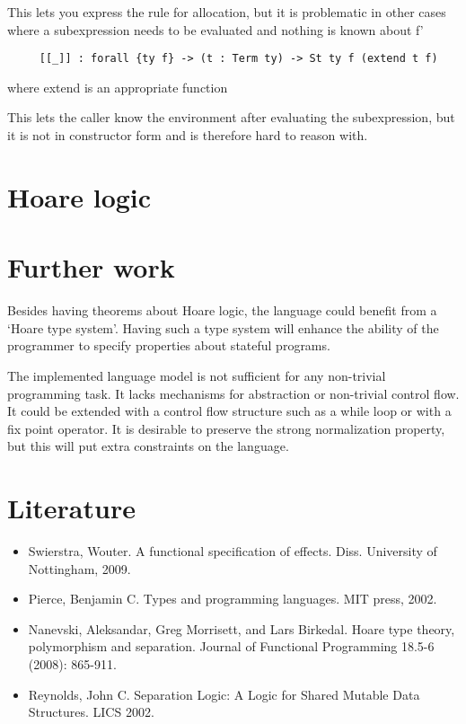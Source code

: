 \documentclass{article}
\begin{document}
This lets you express the rule for allocation, but it is problematic
in other cases where a subexpression needs to be evaluated and
nothing is known about f'


\begin{lstlisting}
     [[_]] : forall {ty f} -> (t : Term ty) -> St ty f (extend t f)
\end{lstlisting}
where extend is an appropriate function

This lets the caller know the environment after evaluating the
subexpression, but it is not in constructor form and is therefore
hard to reason with.

\section{Hoare logic}


\section{Further work}\label{sec:further}

Besides having theorems about Hoare logic, the language could benefit from a `Hoare type system'. Having such a type system will enhance the ability of the programmer to specify properties about stateful programs.

The implemented language model is not sufficient for any non-trivial programming task. It lacks mechanisms for abstraction or non-trivial control flow. It could be extended with a control flow structure such as a while loop or with a fix point operator. It is desirable to preserve the strong normalization property, but this will put extra constraints on the language.

\section{Literature}

\begin{itemize}
\item[] Swierstra, Wouter. A functional specification of effects. Diss. University of Nottingham, 2009.

\item[] Pierce, Benjamin C. Types and programming languages. MIT press, 2002.

\item[] Nanevski, Aleksandar, Greg Morrisett, and Lars Birkedal. Hoare type theory, polymorphism and separation. Journal of Functional Programming 18.5-6 (2008): 865-911.

\item[] Reynolds, John C. Separation Logic: A Logic for Shared Mutable Data Structures. LICS 2002.
\end{itemize}
\end{document}
